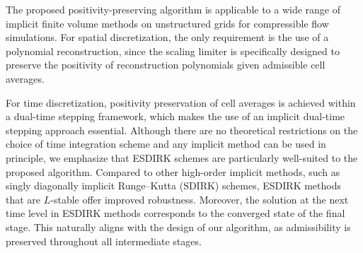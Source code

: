 The proposed positivity-preserving algorithm is applicable to a wide range of implicit finite volume methods on unstructured grids for compressible flow simulations. For spatial discretization, the only requirement is the use of a polynomial reconstruction, since the scaling limiter is specifically designed to preserve the positivity of reconstruction polynomials given admissible cell averages.

For time discretization, positivity preservation of cell averages is achieved within a dual-time stepping framework, which makes the use of an implicit dual-time stepping approach essential. Although there are no theoretical restrictions on the choice of time integration scheme and any implicit method can be used in principle, we emphasize that ESDIRK schemes are particularly well-suited to the proposed algorithm. Compared to other high-order implicit methods, such as singly diagonally implicit Runge–Kutta (SDIRK) schemes, ESDIRK methods that are $L$-stable offer improved robustness. Moreover, the solution at the next time level in ESDIRK methods corresponds to the converged state of the final stage. This naturally aligns with the design of our algorithm, as admissibility is preserved throughout all intermediate stages.



\endgroup
